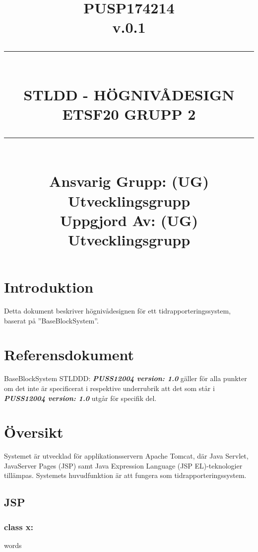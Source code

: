 \documentclass[paper=a4, fontsize=11pt,twoside]{article}
\title{
		\documentNumber{#1}																						
		\documentVersion{#2}																				
		\HRule{0.5pt} \\ %
		\LARGE \textbf{\uppercase{#3}} \\
		\large \textbf{\uppercase{ETSF20 Grupp 2}} 
		\HRule{2pt} \\ [1.5cm]    
		\normalsize            
		\documentResponsible{#4} \\ 
		\documentCreator{#4}  
	}
\newcommand{\HRule}[1]{\rule{\linewidth}{#1}}
\newcommand{\documentNumber}[1]{\centering PUSP1742#1 \\[1.0cm]}
\newcommand{\documentVersion}[1]{\centering \small{v.#1} \\[1.0cm]}
\newcommand{\documentResponsible}[1]{\centering  Ansvarig Grupp: #1}
\newcommand{\documentCreator}[1]{\centering Uppgjord Av: #1}
\newcommand{\grouptitlepage}[4]{ 
	\title{
		\documentNumber{#1}																						
		\documentVersion{#2}																				
		\HRule{0.5pt} \\ %
		\LARGE \textbf{\uppercase{#3}} \\
		\large \textbf{\uppercase{ETSF20 Grupp 2}} 
		\HRule{2pt} \\ [1.5cm]    
		\normalsize            
		\documentResponsible{#4} \\ 
		\documentCreator{#4}  
	}																							
	\maketitle																							
	\thispagestyle{empty} 																					
	\newpage 
}
\begin{document}
\grouptitlepage
{14}
{0.1}
{STLDD - Högnivådesign}
{(UG) Utvecklingsgrupp}
\tableofcontents

\section{Introduktion}
Detta dokument beskriver högnivådesignen för ett tidrapporteringssystem, baserat på ”BaseBlockSystem”.

\section{Referensdokument}
BaseBlockSystem STLDDD: \textbf{\textit{PUSS12004 version: 1.0}} gäller för alla punkter om det inte är specificerat i respektive underrubrik att det som står i \textbf{\textit{PUSS12004 version: 1.0}} utgår för specifik del.


\section{Översikt}
Systemet är utvecklad för applikationsservern Apache Tomcat, där Java Servlet, JavaServer Pages (JSP) samt Java Expression Language (JSP EL)-teknologier tillämpas. Systemets huvudfunktion är att fungera som tidrapporteringssystem.

\subsection{JSP}

\subsubsection{class x:} words 



\end{document}
